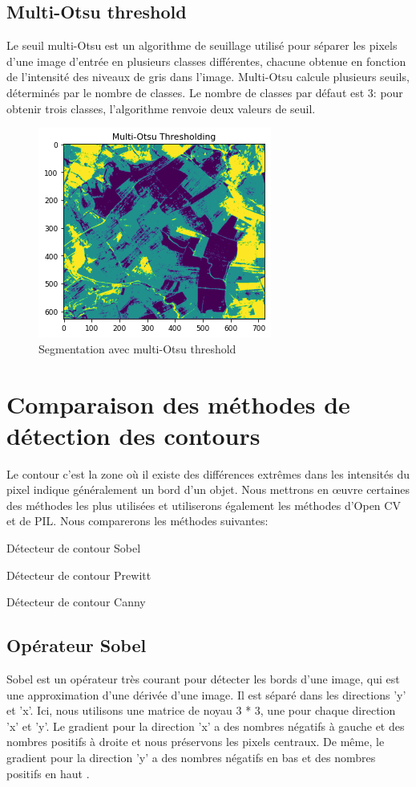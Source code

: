 \documentclass[12pt, openany]{report}
\begin{document}
\subsection{Multi-Otsu threshold}
Le seuil multi-Otsu est un algorithme de seuillage utilisé pour séparer les pixels d'une image d'entrée en plusieurs classes différentes, chacune obtenue en fonction de l'intensité des niveaux de gris dans l'image.
Multi-Otsu calcule plusieurs seuils, déterminés par le nombre de classes. Le nombre de classes par défaut est 3: pour obtenir trois classes, l'algorithme renvoie deux valeurs de seuil.

\begin{figure}[ht]
\centering
\includegraphics[scale=0.9]{osupng.png}
\caption{Segmentation avec multi-Otsu threshold}
\end{figure}

\section{Comparaison des méthodes de détection des contours}\cite{comparaison}
Le contour c’est la zone où il existe des différences extrêmes dans les intensités du pixel indique généralement un bord d'un objet.
Nous mettrons en œuvre certaines des méthodes les plus utilisées et utiliserons également les méthodes d'Open CV et de PIL.
\noindent Nous comparerons les méthodes suivantes:
\begin{mylist}
\item Détecteur de contour Sobel
\item Détecteur de contour Prewitt
\item Détecteur de contour Canny
\end{mylist}

\subsection{Opérateur Sobel}
Sobel est un opérateur très courant pour détecter les bords d'une image, qui est une approximation d'une dérivée d'une image. Il est séparé dans les directions 'y' et 'x'. Ici, nous utilisons une matrice de noyau 3 * 3, une pour chaque direction 'x' et 'y'. Le gradient pour la direction 'x' a des nombres négatifs à gauche et des nombres positifs à droite et nous préservons les pixels centraux. De même, le gradient pour la direction 'y' a des nombres négatifs en bas et des nombres positifs en haut .
\end{document}
